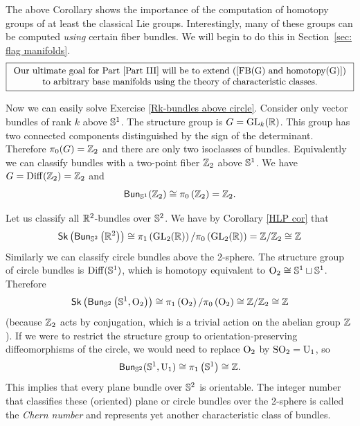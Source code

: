 The above Corollary shows the importance of the computation of homotopy groups of at least the classical Lie groups. Interestingly, many of these groups can be computed \emph{using} certain fiber bundles. We will begin to do this in Section~\ref{sec: flag manifolds}.
\[\boxed{\begin{array}{c}
    \text{Our ultimate goal for Part \ref{Part III} will be to extend (\ref{FB(G) and homotopy(G)})}\\
    \text{to arbitrary base manifolds using the theory of characteristic classes.}
\end{array}}
\] 


\begin{example}
    Now we can easily solve Exercise \ref{Rk-bundles above circle}. Consider only vector bundles of rank $k$ above $\mathbb{S}^1$. The structure group is $G=\operatorname{GL}_k(\mathbb{R})$. This group has two connected components distinguished by the sign of the determinant. Therefore $\pi_0(G)=\mathbb{Z}_2$ and there are only two isoclasses of bundles. Equivalently we can classify bundles with a two-point fiber $\mathbb{Z}_2$ above $\mathbb{S}^1$. We have $G=\operatorname{Diff}(\mathbb{Z}_2)=\mathbb{Z}_2$ and
    \[
        \mathsf{Bun}_{\mathbb{S}^1}(\mathbb{Z}_2)\cong \pi_{0}\left(\mathbb{Z}_2\right)=\mathbb{Z}_2.
    \]
    \end{example}
    \begin{example}
    Let us classify all $\mathbb{R}^2$-bundles over $\mathbb{S}^2$. We have by Corollary \ref{HLP cor} that 
    \[
        \mathsf{Sk}\left(\mathsf{Bun}_{\mathbb{S}^2}\left(\mathbb{R}^2\right)\right)\cong \pi_{1}\left(\operatorname{GL}_2(\mathbb{R} )\right)/\pi_0\left(\operatorname{GL}_2(\mathbb{R} )\right)=\mathbb{Z}/\mathbb{Z}_2\cong \mathbb{Z}
    \]
    Similarly we can classify circle bundles above the 2-sphere. The structure group of circle bundles is $\operatorname{Diff}(\mathbb{S}^1)$, which is homotopy equivalent to $\operatorname{O}_2\cong \mathbb{S}^1\sqcup \mathbb{S}^1$. Therefore
    \[
        \mathsf{Sk}\left(\mathsf{Bun}_{\mathbb{S}^2}\left(\mathbb{S}^1,\operatorname{O}_2\right)\right)\cong \pi_{1}\left(\operatorname{O}_2\right)/\pi_0\left(\operatorname{O}_2\right)\cong\mathbb{Z}/\mathbb{Z}_2\cong\mathbb{Z}
    \]
    (because $\mathbb{Z}_2$ acts by conjugation, which is a trivial action on the abelian group $\mathbb{Z}$). If we were to restrict the structure group to orientation-preserving diffeomorphisms of the circle, we would need to replace $\operatorname{O}_2$ by $\operatorname{SO}_2=\operatorname{U}_1$, so 
    \[
        \mathsf{Bun}_{\mathbb{S}^2}(\mathbb{S}^1,\operatorname{U}_1)\cong \pi_{1}\left(\mathbb{S}^1\right)\cong\mathbb{Z}.
    \]
    This implies that every plane bundle over $\mathbb{S}^2$ is orientable. The integer number that classifies these (oriented) plane or circle bundles over the 2-sphere is called the \emph{Chern number} and represents yet another characteristic class of bundles.
\end{example}

